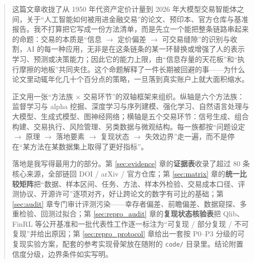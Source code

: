 \begin{abstract}
\noindent 这篇文章收拢了从 1950 年代资产定价计量到 2026 年大模型交易智能体之间，关于“人工智能如何被用进金融交易”的论文、预印本、官方仓库与基准报告。我不打算把它写成一份方法清单，而是先立一个能把整条链路串起来的命题：交易的本质是“信息 $\to$ 定价偏差 $\to$ 可交易缝隙”的识别与收割，AI 的每一种应用，无非是在这条链条的某一环替换或增强了人的表示学习、预测或决策能力；因此它的能力上限，由“信息存量的天花板”和“执行摩擦的地板”共同夹住。这个命题解释了一件长期被回避的事——为什么论文里动辄年化几十个百分点的策略，一旦落到真实账户上就大面积缩水。

正文用一张“方法族 $\times$ 交易环节”的双轴框架来组织。纵轴是六个方法族：监督学习与 alpha 挖掘、深度学习与序列建模、强化学习、自然语言处理与大模型、生成式模型、图神经网络；横轴是五个交易环节：信号生成、组合构建、交易执行、风险管理、另类数据与微观结构。每一族都按“问题设定 $\to$ 原理 $\to$ 落地要素 $\to$ 复现状态 $\to$ 失效边界”走一遍，而不是停在“某方法在某数据集上取得了更好指标”。

落地是我写得最用力的部分。第 \ref{sec:evidence} 章的\textbf{证据表}收录了超过 80 条核心来源，全部链回 DOI / arXiv / 官方仓库；第 \ref{sec:matrix} 章的\textbf{统一比较矩阵}把“数据、样本区间、任务、方法、样本外检验、交易成本口径、评测协议、开源许可”逐项对齐，好让跨论文的数字有可比的基础；第 \ref{sec:audit} 章专门审计评测污染——幸存者偏差、前瞻偏差、数据窥探、多重检验、回测过拟合；第 \ref{sec:repro_audit} 章的\textbf{复现状态核验表}把 Qlib、FinRL 等公开基准和一批代表性工作逐一标注为“可复现 / 部分复现 / 不可复现”并给出原因；第 \ref{sec:repro_protocol} 章给出一套按 P0--P3 分级的可复现实验方案，配套的参考实现骨架放在随附的 \texttt{code/} 目录里。结论附置信度分级，边界条件如实写明。

\end{abstract}
